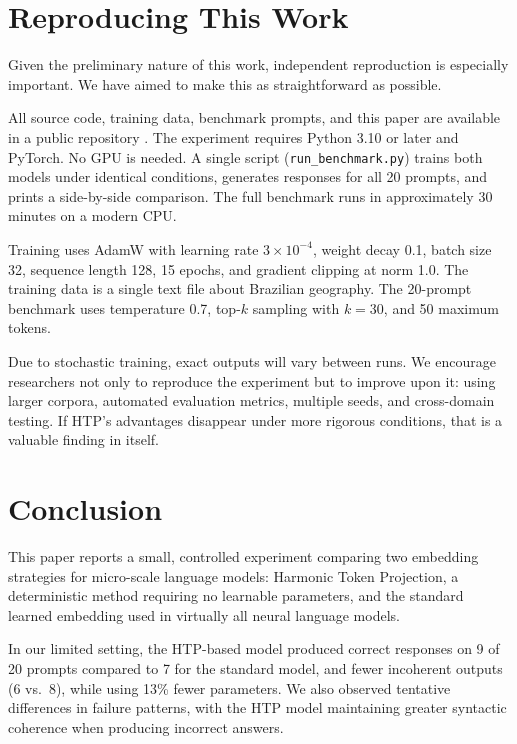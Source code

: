 \documentclass[10pt,twocolumn,a4paper]{article}
\newcommand{\htpname}{HTP}
\begin{document}
\section{Reproducing This Work}
\label{sec:reproducibility}

Given the preliminary nature of this work, independent reproduction is especially important. We have aimed to make this as straightforward as possible.

All source code, training data, benchmark prompts, and this paper are available in a public repository \cite{htpbenchmark2025}. The experiment requires Python 3.10 or later and PyTorch. No GPU is needed. A single script (\texttt{run\_benchmark.py}) trains both models under identical conditions, generates responses for all 20 prompts, and prints a side-by-side comparison. The full benchmark runs in approximately 30 minutes on a modern CPU.

Training uses AdamW with learning rate $3 \times 10^{-4}$, weight decay 0.1, batch size 32, sequence length 128, 15 epochs, and gradient clipping at norm 1.0. The training data is a single text file about Brazilian geography. The 20-prompt benchmark uses temperature 0.7, top-$k$ sampling with $k = 30$, and 50 maximum tokens.

Due to stochastic training, exact outputs will vary between runs. We encourage researchers not only to reproduce the experiment but to improve upon it: using larger corpora, automated evaluation metrics, multiple seeds, and cross-domain testing. If \htpname{}'s advantages disappear under more rigorous conditions, that is a valuable finding in itself.

\section{Conclusion}
\label{sec:conclusion}

This paper reports a small, controlled experiment comparing two embedding strategies for micro-scale language models: Harmonic Token Projection, a deterministic method requiring no learnable parameters, and the standard learned embedding used in virtually all neural language models.

In our limited setting, the \htpname{}-based model produced correct responses on 9 of 20 prompts compared to 7 for the standard model, and fewer incoherent outputs (6 vs.\ 8), while using 13\% fewer parameters. We also observed tentative differences in failure patterns, with the \htpname{} model maintaining greater syntactic coherence when producing incorrect answers.
\end{document}
